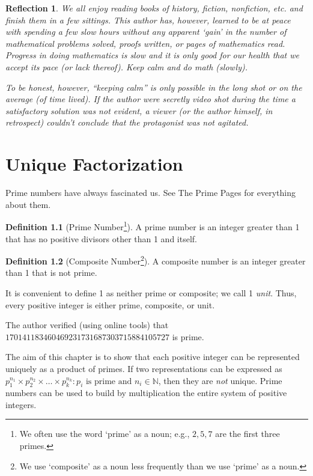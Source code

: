\documentclass[english,notitlepage,smartquotes]{hgbreport}
\theoremstyle{definition}
\newtheorem{definition}{Definition}
\theoremstyle{remark}
\theoremstyle{plain}
\newtheorem{reflection}{Reflection}
\begin{document}
\begin{enumerate}[label=\textbf{\arabic*}.]
\begin{enumerate}
\begin{reflection}
We all enjoy reading books of history, fiction, nonfiction, etc. and finish them in a few sittings. This author has, however, learned to be at peace with spending a few slow hours without any apparent `gain' in the number of mathematical problems solved, proofs written, or pages of mathematics read. Progress in doing mathematics is slow and it is only good for our health that we accept its pace (or lack thereof). Keep calm and do math (slowly).

To be honest, however, ``keeping calm'' is only possible in the long shot or on the average (of time lived). If the author were secretly video shot during the time a satisfactory solution was not evident, a viewer (or the author himself, in retrospect) couldn't conclude that the protagonist was not agitated.
\end{reflection}
\end{enumerate}
\end{enumerate}
\chapter{Unique Factorization}

Prime numbers have always fascinated us. See The Prime Pages \cite{PrimePages} for everything about them.

\begin{definition}[Prime Number\footnote{We often use the word `prime' as a noun; e.g., $2,5,7$ are the first three primes.}]
A prime number is an integer greater than 1 that has no positive divisors other than 1 and itself. 
\end{definition}
\begin{definition}[Composite Number\footnote{We use `composite' as a noun less frequently than we use `prime' as a noun.}]
A composite number is an integer greater than 1 that is not prime. 
\end{definition}

It is convenient to define 1 as neither prime or composite; we call 1 \emph{unit}. Thus, every positive integer is either prime, composite, or unit. 

The author verified (using online tools) that $170141183460469231731687303715884105727$ is prime. 

The aim of this chapter is to show that each positive integer can be represented uniquely as a product of primes. If two representations can be expressed as $p_1^{n_1}\times p_2^{n_2}\times\dots\times p_k^{n_k}: p_i\text{ is prime and } n_i\in\mathbb{N}$, then they are \emph{not} unique. Prime numbers can be used to build by multiplication the entire system of positive integers.
\end{document}
